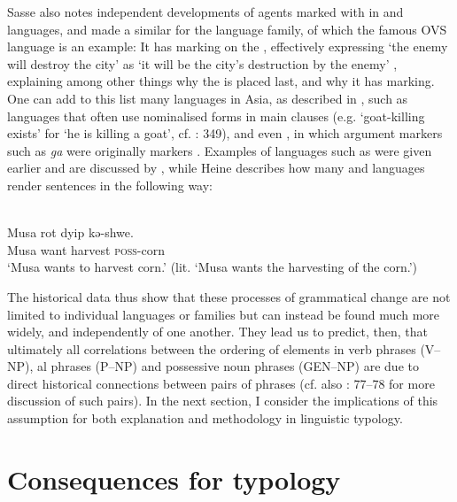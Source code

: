 \documentclass[output=paper]{langsci/langscibook}
\begin{document}
Sasse also notes independent developments of agents marked with   in  and  languages, and \citet{Gildea1997} made a similar  for the  language family, of which the famous OVS language  is an example: It has  marking on the , effectively expressing ‘the enemy will destroy the city’ as ‘it will be the city’s destruction by the enemy’ \citep[153]{Gildea1997}, explaining among other things why the  is placed last, and why it has  marking. One can add to this list many languages in Asia, as described in \citet{YapEtAl2011}, such as  languages that often use nominalised forms in main clauses (e.g. ‘goat-killing exists’ for ‘he is killing a goat’, cf. \citealt{DeLancey2011}: 349), and even , in which argument markers such as \textit{ga} were originally  markers \citep[461]{Shinzato2011}. Examples of  languages such as  were given earlier and are discussed by \citet{Claudi1994}, while Heine describes how many  and  languages render  sentences in the following way:

\ea\label{ex:key:} 
\\
\gll Musa   rot   dyip   kə-shwe.\\
     Musa   want   harvest   \textsc{poss-}corn\\
\glt ‘Musa wants to harvest corn.’ (lit. ‘Musa wants the harvesting of the corn.’)
\z

The historical data thus show that these processes of grammatical change are not limited to individual languages or families but can instead be found much more widely, and independently of one another. They lead us to predict, then, that ultimately all correlations between the ordering of elements in verb phrases (V–NP), al phrases (P–NP) and possessive noun phrases (GEN–NP) are due to direct historical connections between pairs of phrases (cf. also \citealt{Croft2003}: 77–78 for more discussion of such pairs). In the next section, I consider the implications of this assumption for both explanation and methodology in linguistic typology.

\section{Consequences for typology}\label{sec:collins:3}
\end{document}

